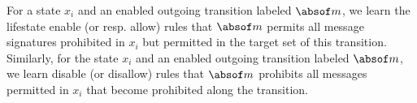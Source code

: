 \documentclass[10pt,reprint,nocopyrightspace,numbers]{sigplanconf}
\begin{document}
For a state
$x_i$
and an enabled outgoing transition labeled $\absmsg$, we learn the lifestate enable (or resp. allow) rules that $\absmsg$ permits 
all message signatures prohibited in $x_i$ but permitted in the 
target set of this transition.
Similarly, for the state $x_i$ and an enabled outgoing transition labeled $\absmsg$, we learn  disable (or disallow) rules that $\absmsg$ prohibits 
all messages permitted in $x_i$ that become prohibited along the transition.

\end{document}

